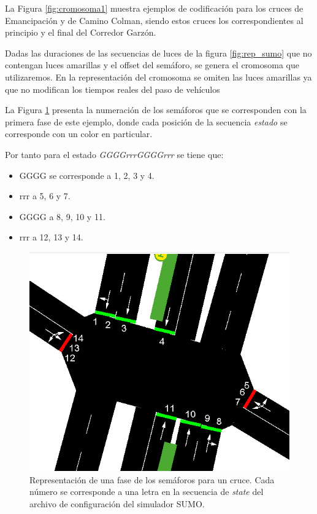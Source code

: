 La Figura \ref{fig:cromosoma1} muestra ejemplos de codificación para los cruces de Emancipación y de Camino Colman, siendo estos cruces los correspondientes al principio y el final del Corredor Garzón.

 Dadas las duraciones de las secuencias de luces de la figura \ref{fig:rep_sumo} que no contengan luces amarillas y el offset del semáforo, se genera el cromosoma que utilizaremos. En la representación del cromosoma se omiten las luces amarillas ya que no modifican los tiempos reales del paso de vehículos

La Figura \ref{fig:sem_numerados} presenta la numeración de los semáforos que se corresponden con la primera fase de este ejemplo, donde cada posición de la secuencia \emph{estado} se corresponde con un color en particular. 

\newpage
Por tanto para el estado \emph{GGGGrrrGGGGrrr} se tiene que:
\begin{itemize}
	\item GGGG se corresponde a 1, 2, 3 y 4. 
	\item rrr a 5, 6 y 7. 
	\item GGGG a 8, 9, 10 y 11. 
	\item rrr a 12, 13 y 14. 
\end{itemize}

\begin{figure}[H]
	\centering
	\includegraphics[width=0.7\linewidth]{Figures/semaforos_numerado}
	\caption[Representación de una fase de los semáforos para un cruce.]{Representación de una fase de los semáforos para un cruce. Cada número se corresponde a una letra en la secuencia de \emph{state} del archivo de configuración del simulador SUMO.}
	\label{fig:sem_numerados}
\end{figure}

